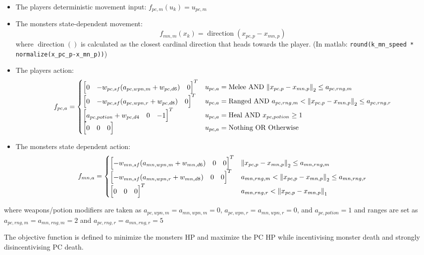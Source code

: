 \documentclass[9pt, onecolumn]{report}
\begin{document}
\begin{itemize}
    \item The players deterministic movement input: $f_{pc,m}(u_k) = u_{pc,m}$
    \item The monsters state-dependent movement:\[
        f_{mn,m}(x_k) = \operatorname{direction}(x_{pc,p} - x_{mn,p})
    \] where $\operatorname{direction}()$ is calculated as the closest cardinal direction that heads towards the player. 
    (In matlab: \verb!round(k_mn_speed * normalize(x_pc_p-x_mn_p))!)
    \item The players action:\[
        f_{pc,a} = \begin{cases}
            \mqty[0 & -w_{pc,sf}(a_{pc,wpn,m} + w_{pc,d6}) & 0]^T & u_{pc,a} = \text{Melee} \text{ AND } \norm{x_{pc,p} - x_{mn,p}}_2 \leq a_{pc,rng,m}\\
            \mqty[0 & -w_{pc,sf}(a_{pc,wpn,r} + w_{pc,d8}) & 0]^T & u_{pc,a} = \text{Ranged} \text{ AND } a_{pc,rng,m} < \norm{x_{pc,p} - x_{mn,p}}_2 \leq a_{pc,rng,r}\\
            \mqty[a_{pc,potion} + w_{pc,d4} & 0 & -1]^T & u_{pc,a} = \text{Heal} \text{ AND } x_{pc,potion} \geq 1\\%
            \mqty[0 & 0 & 0] & u_{pc,a} = \text{Nothing} \text{ OR } \text{Otherwise}
        \end{cases}
    \]
    \item The monsters state dependent action: \[
        f_{mn,a} = \begin{cases}
            \mqty[-w_{mn,sf}(a_{mn,wpn,m} + w_{mn,d6}) & 0 & 0]^T & \norm{x_{pc,p} - x_{mn,p}}_2 \leq a_{mn,rng,m}\\
            \mqty[- w_{mn,sf}(a_{mn,wpn,r} + w_{mn,d8}) & 0 & 0]^T & a_{mn,rng,m} < \norm{x_{pc,p} - x_{mn,p}}_2 \leq  a_{mn,rng,r}\\
            \mqty[0 & 0 & 0]^T &  a_{mn,rng,r} < \norm{x_{pc,p} - x_{mn,p}}_1
        \end{cases}
    \]
\end{itemize}
where weapons/potion modifiers are taken as $a_{pc,wpn,m} = a_{mn,wpn,m} = 0$, $a_{pc,wpn,r} = a_{mn,wpn,r} = 0$, and $a_{pc,potion} = 1$
and ranges are set as $a_{pc,rng,m}= a_{mn,rng,m} = 2$ and $ a_{pc,rng,r} =  a_{mn,rng,r} = 5$

The objective function is defined to minimize the monsters HP and maximize the PC HP while incentivising monster death and strongly disincentivising PC death.
\end{document}
